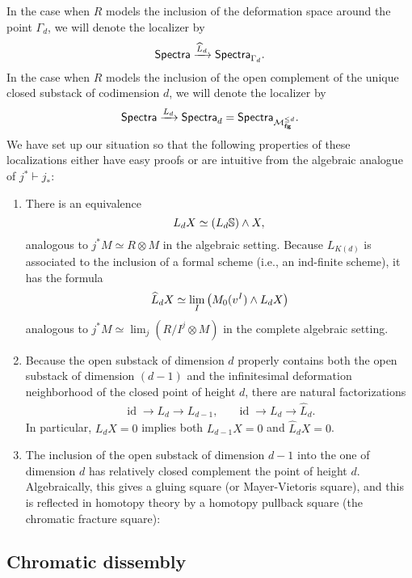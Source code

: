 In the case when $R$ models the inclusion of the deformation space around the point $\Gamma_d$, we will denote the localizer by \[\mathsf{Spectra} \xrightarrow{\widehat L_d} \mathsf{Spectra}_{\Gamma_d}.\]  In the case when $R$ models the inclusion of the open complement of the unique closed substack of codimension $d$, we will denote the localizer by \[\mathsf{Spectra} \xrightarrow{L_d} \mathsf{Spectra}_d = \mathsf{Spectra}_{\mathcal{M}_{\mathbf{fg}}^{\le d}}.\]  We have set up our situation so that the following properties of these localizations either have easy proofs or are intuitive from the algebraic analogue of $j^* \vdash j_*$:
\begin{enumerate}
\item There is an equivalence \[L_d X \simeq (L_d \mathbb S) \wedge X,\] analogous to $j^* M \simeq R \otimes M$ in the algebraic setting.  Because $L_{K(d)}$ is associated to the inclusion of a formal scheme (i.e., an ind-finite scheme), it has the formula \[\widehat L_d X \simeq \lim_I \left( M_0(v^I) \wedge L_d X \right)\] analogous to $j^* M \simeq \lim_j (R/I^j \otimes M)$ in the complete algebraic setting.
\item Because the open substack of dimension $d$ properly contains both the open substack of dimension $(d-1)$ and the infinitesimal deformation neighborhood of the closed point of height $d$, there are natural factorizations
\begin{align*}
\operatorname{id} \to L_d \to L_{d-1}, & & \operatorname{id} \to L_d \to \widehat L_d.
\end{align*}
In particular, $L_d X = 0$ implies both $L_{d-1} X = 0$ and $\widehat L_d X = 0$.
\item The inclusion of the open substack of dimension $d-1$ into the one of dimension $d$ has relatively closed complement the point of height $d$.  Algebraically, this gives a gluing square (or Mayer-Vietoris square), and this is reflected in homotopy theory by a homotopy pullback square (the chromatic fracture square):
\begin{center}
\end{center}
\end{enumerate}


\subsection{Chromatic dissembly}

